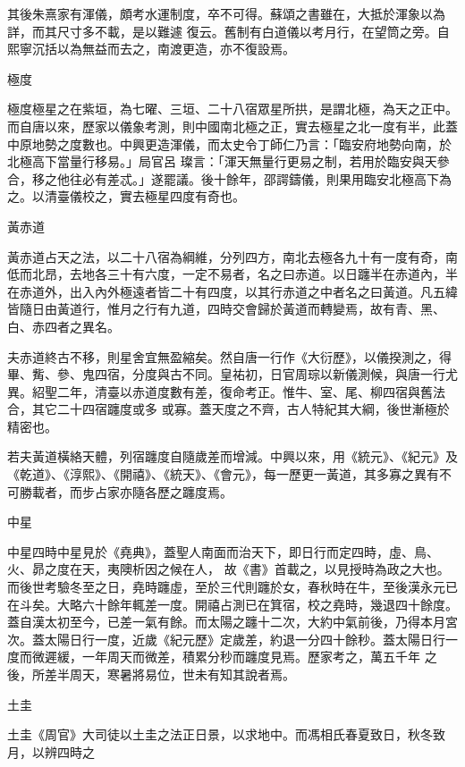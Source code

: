\begin{pinyinscope}
 其後朱熹家有渾儀，頗考水運制度，卒不可得。蘇頌之書雖在，大抵於渾象以為詳，而其尺寸多不載，是以難遽
 復云。舊制有白道儀以考月行，在望筒之旁。自熙寧沉括以為無益而去之，南渡更造，亦不復設焉。



 極度



 極度極星之在紫垣，為七曜、三垣、二十八宿眾星所拱，是謂北極，為天之正中。而自唐以來，歷家以儀象考測，則中國南北極之正，實去極星之北一度有半，此蓋中原地勢之度數也。中興更造渾儀，而太史令丁師仁乃言：「臨安府地勢向南，於北極高下當量行移易。」局官呂
 璨言：「渾天無量行更易之制，若用於臨安與天參合，移之他往必有差忒。」遂罷議。後十餘年，邵諤鑄儀，則果用臨安北極高下為之。以清臺儀校之，實去極星四度有奇也。



 黃赤道



 黃赤道占天之法，以二十八宿為綱維，分列四方，南北去極各九十有一度有奇，南低而北昂，去地各三十有六度，一定不易者，名之曰赤道。以日躔半在赤道內，半
 在赤道外，出入內外極遠者皆二十有四度，以其行赤道之中者名之曰黃道。凡五緯皆隨日由黃道行，惟月之行有九道，四時交會歸於黃道而轉變焉，故有青、黑、白、赤四者之異名。



 夫赤道終古不移，則星舍宜無盈縮矣。然自唐一行作《大衍歷》，以儀揆測之，得畢、觜、參、鬼四宿，分度與古不同。皇祐初，日官周琮以新儀測候，與唐一行尤異。紹聖二年，清臺以赤道度數有差，復命考正。惟牛、室、尾、柳四宿與舊法合，其它二十四宿躔度或多
 或寡。蓋天度之不齊，古人特紀其大綱，後世漸極於精密也。



 若夫黃道橫絡天體，列宿躔度自隨歲差而增減。中興以來，用《統元》、《紀元》及《乾道》、《淳熙》、《開禧》、《統天》、《會元》，每一歷更一黃道，其多寡之異有不可勝載者，而步占家亦隨各歷之躔度焉。



 中星



 中星四時中星見於《堯典》，蓋聖人南面而治天下，即日行而定四時，虛、鳥、火、昴之度在天，夷隩析因之候在人，
 故《書》首載之，以見授時為政之大也。而後世考驗冬至之日，堯時躔虛，至於三代則躔於女，春秋時在牛，至後漢永元已在斗矣。大略六十餘年輒差一度。開禧占測已在箕宿，校之堯時，幾退四十餘度。蓋自漢太初至今，已差一氣有餘。而太陽之躔十二次，大約中氣前後，乃得本月宮次。蓋太陽日行一度，近歲《紀元歷》定歲差，約退一分四十餘秒。蓋太陽日行一度而微遲緩，一年周天而微差，積累分秒而躔度見焉。歷家考之，萬五千年
 之後，所差半周天，寒暑將易位，世未有知其說者焉。



 土圭



 土圭《周官》大司徒以土圭之法正日景，以求地中。而馮相氏春夏致日，秋冬致月，以辨四時之



\end{pinyinscope}